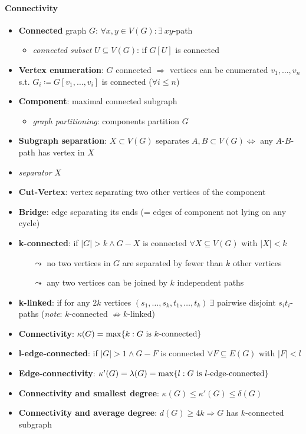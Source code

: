 \paragraph{Connectivity}
\begin{itemize}
  \item \textbf{Connected} graph $ G $: $ \forall x,y \in V(G) : \exists \ xy $-path
  \begin{itemize}
    \item \emph{connected subset} $ U \subseteq V(G) $: if $ G[U] $ is connected  
  \end{itemize}
  \item \textbf{Vertex enumeration}: $ G $ connected $ \Rightarrow $ vertices can be enumerated $ v_1, \dots, v_n $ s.t. $ G_i \coloneqq G[v_1, \dots, v_i] $ is connected ($ \forall i \leq n $)
  \item \textbf{Component}: maximal connected subgraph
  \begin{itemize}
    \item \emph{graph partitioning}: components partition $ G $ 
  \end{itemize}
  \item \textbf{Subgraph separation}: $ X \subset V(G) $ separates $ A,B \subset V(G) \Leftrightarrow $ any $ A $-$ B $-path has vertex in $ X $
  \item \emph{separator} $ X $
  \item \textbf{Cut-Vertex}: vertex separating two other vertices of the component
  \item \textbf{Bridge}: edge separating its ends (= edges of component not lying on any cycle)
  \item \textbf{k-connected}: if $ \vert G \vert > k \wedge G - X $ is connected $ \forall X \subseteq V(G) $ with $ \vert X \vert < k $
  \begin{itemize}
    \item[$ \leadsto $] no two vertices in $ G $ are separated by fewer than $ k $ other vertices
    \item[$ \leadsto $] any two vertices can be joined by $ k $ independent paths
  \end{itemize}
  \item \textbf{k-linked}: if for any $ 2k $ vertices $ (s_1, \dots, s_k, t_1, \dots, t_k) \ \exists $ pairwise disjoint $ s_it_i $-paths (\emph{note}: $ k $-connected $ \not \Rightarrow k $-linked)
  \item \textbf{Connectivity}: $ \kappa(G) = \max\{ k : G \text{ is $ k $-connected} \} $
  \item \textbf{l-edge-connected}: if $ \vert G \vert > 1 \wedge G - F $ is connected $ \forall F \subseteq E(G) $ with $ \vert F \vert < l $
  \item \textbf{Edge-connectivity}: $ \kappa'(G) = \lambda(G) = \max\{ l : G \text{ is $ l $-edge-connected} \} $
  \item \textbf{Connectivity and smallest degree}: $ \kappa(G) \leq \kappa'(G) \leq \delta(G) $
  \item \textbf{Connectivity and average degree}: $ d(G) \geq 4k \Rightarrow G $ has $ k $-connected subgraph
\end{itemize}

